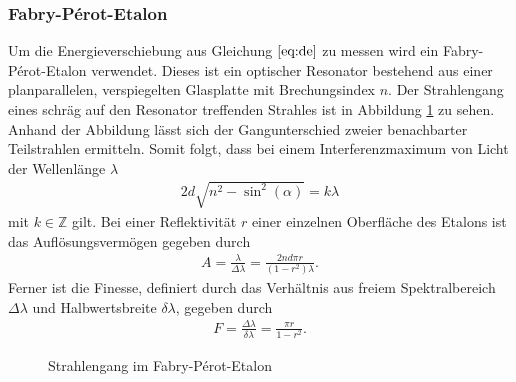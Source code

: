 \subsubsection{Fabry-Pérot-Etalon}
Um die Energieverschiebung aus Gleichung $\ref{eq:de}$ zu messen wird ein Fabry-Pérot-Etalon verwendet. Dieses ist ein optischer Resonator bestehend aus einer planparallelen, verspiegelten Glasplatte mit Brechungsindex $n$. Der Strahlengang eines schräg auf den Resonator treffenden Strahles ist in Abbildung \ref{fig:fabry} zu sehen. Anhand der Abbildung lässt sich der Gangunterschied zweier benachbarter Teilstrahlen ermitteln. Somit folgt, dass bei einem Interferenzmaximum von Licht der Wellenlänge $\lambda$
\begin{align}
  2d\sqrt{n^2-\sin^2(\alpha)}=k\lambda
\end{align}
mit $k \in \mathbb{Z}$ gilt. Bei einer Reflektivität $r$ einer einzelnen Oberfläche des Etalons ist das Auflösungsvermögen gegeben durch \cite{fabryperotaufloes}
\begin{align}
  A = \frac{\lambda}{\Delta \lambda}=\frac{2 n d \pi r}{(1-r^2)\lambda}.
\end{align}
Ferner ist die Finesse, definiert durch das Verhältnis aus freiem Spektralbereich $\Delta \lambda$ und Halbwertsbreite $\delta \lambda$, gegeben durch
\begin{align}
  F=\frac{\Delta \lambda}{\delta \lambda}=\frac{\pi r}{1-r^2}.
\end{align} 


\begin{figure}[h]
  \centering
  \caption{Strahlengang im Fabry-Pérot-Etalon}
  \label{fig:fabry}
\end{figure}

